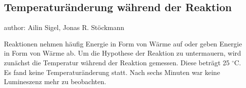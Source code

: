 \subsection{Temperaturänderung während der Reaktion}
author: Ailin Sigel, Jonas R. Stöckmann

Reaktionen nehmen häufig Energie in Form von Wärme auf oder geben Energie in Form von Wärme ab. Um die Hypothese der Reaktion zu untermauern, wird zunächst die Temperatur während der Reaktion gemessen. Diese beträgt 25 $^\circ$C. Es fand keine Temperaturänderung statt. Nach sechs Minuten war keine Lumineszenz mehr zu beobachten. 


